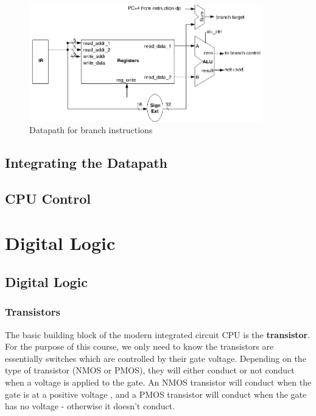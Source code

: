 \documentclass{article}
\begin{document}
	\begin{figure}
		\centering
		\includegraphics[width=0.9\textwidth]{branch_jump_datapath}
		\caption{Datapath for branch instructions}
		\label{fig:branch jump datapath}
	\end{figure}			
	
	\subsection{Integrating the Datapath}
	\subsection{CPU Control}
	
	\section{Digital Logic}
	\subsection{Digital Logic}
	\subsubsection{Transistors}
	The basic building block of the modern integrated circuit CPU is the \textbf{transistor}. For the purpose of this course, we only need to know the transistors are essentially switches which are controlled by their gate voltage. Depending on the type of transistor (NMOS or PMOS), they will either conduct or not conduct when a voltage is applied to the gate. An NMOS transistor will conduct when the gate is at a positive voltage , and a PMOS transistor will conduct when the gate has no voltage - otherwise it doesn't conduct.
	
\end{document}
